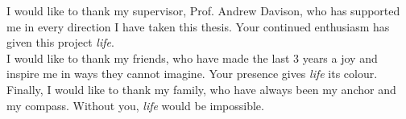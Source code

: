 I would like to thank my supervisor, Prof. Andrew Davison, who has supported me in every direction I have taken this thesis. Your continued enthusiasm has given this project \textit{life}.\\

\noindent
I would like to thank my friends, who have made the last 3 years a joy and inspire me in ways they cannot imagine. Your presence gives \textit{life} its colour.\\

\noindent
Finally, I would like to thank my family, who have always been my anchor and my compass. Without you, \textit{life} would be impossible.